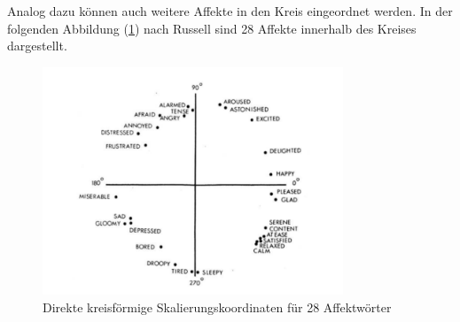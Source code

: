 \documentclass[./dokumentation.tex]{subfiles}
\begin{document}
Analog dazu können auch weitere Affekte in den Kreis eingeordnet werden. In der folgenden Abbildung (\ref{fig5:28affect}) nach Russell sind 28 Affekte innerhalb des Kreises dargestellt.

\begin{figure}[h]
    \centering
    \includegraphics[width=0.8\textwidth]{bilder/russell2.png}
    \caption{Direkte kreisförmige Skalierungskoordinaten für 28 Affektwörter \cite{Russell1980}}
    \label{fig5:28affect}
\end{figure}\\
\end{document}
